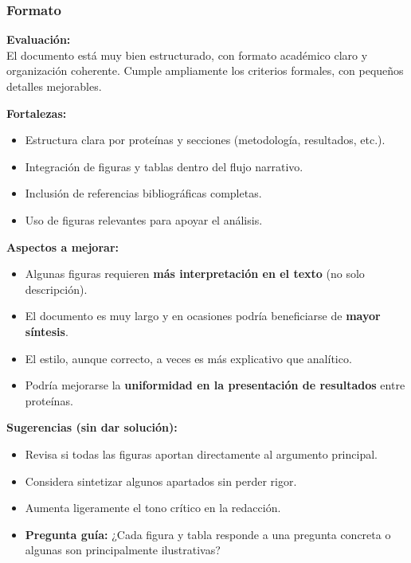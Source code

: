 \documentclass[
  11pt,
  a4paper,
  twoside]{scrreprt}
\begin{document}
\subsubsection{Formato}\label{formato}

\textbf{Evaluación:}\\
El documento está muy bien estructurado, con formato académico claro y
organización coherente. Cumple ampliamente los criterios formales, con
pequeños detalles mejorables.

\textbf{Fortalezas:}

\begin{itemize}
\item
  Estructura clara por proteínas y secciones (metodología, resultados,
  etc.).
\item
  Integración de figuras y tablas dentro del flujo narrativo.
\item
  Inclusión de referencias bibliográficas completas.
\item
  Uso de figuras relevantes para apoyar el análisis.
\end{itemize}

\textbf{Aspectos a mejorar:}

\begin{itemize}
\item
  Algunas figuras requieren \textbf{más interpretación en el texto} (no
  solo descripción).
\item
  El documento es muy largo y en ocasiones podría beneficiarse de
  \textbf{mayor síntesis}.
\item
  El estilo, aunque correcto, a veces es más explicativo que analítico.
\item
  Podría mejorarse la \textbf{uniformidad en la presentación de
  resultados} entre proteínas.
\end{itemize}

\textbf{Sugerencias (sin dar solución):}

\begin{itemize}
\item
  Revisa si todas las figuras aportan directamente al argumento
  principal.
\item
  Considera sintetizar algunos apartados sin perder rigor.
\item
  Aumenta ligeramente el tono crítico en la redacción.
\item
  \textbf{Pregunta guía:} ¿Cada figura y tabla responde a una pregunta
  concreta o algunas son principalmente ilustrativas?
\end{itemize}
\end{document}
